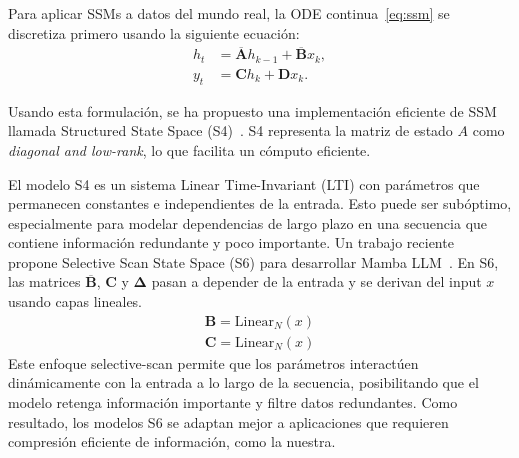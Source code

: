 Para aplicar SSMs a datos del mundo real, la ODE continua~\eqref{eq:ssm} se discretiza primero usando la siguiente ecuación:
\begin{equation}
\begin{aligned}
\label{eq:discrete_ssm}
h_t &= \mathbf{\overline{A}}h_{k-1} + \mathbf{\overline{B}}x_{k}, \\
y_t &= \mathbf{C}h_k + \mathbf{D}x_k.
\end{aligned}
\end{equation}

Usando esta formulación, se ha propuesto una implementación eficiente de SSM llamada Structured State Space (S4)~\cite{gu2022efficiently}. S4 representa la matriz de estado $A$ como \textit{diagonal and low-rank}, lo que facilita un cómputo eficiente.

El modelo S4 es un sistema Linear Time-Invariant (LTI) con parámetros que permanecen constantes e independientes de la entrada. Esto puede ser subóptimo, especialmente para modelar dependencias de largo plazo en una secuencia que contiene información redundante y poco importante. Un trabajo reciente~\cite{gu2023mamba} propone Selective Scan State Space (S6) para desarrollar Mamba LLM~\cite{gu2023mamba}. En S6, las matrices $\mathbf{\overline{B}}$, $ \mathbf{C}$ y $\mathbf{\Delta}$ pasan a depender de la entrada y se derivan del input $x$ usando capas lineales.
\begin{equation}
\begin{aligned}
   \mathbf{B} = \text{Linear}_N(x)\\
   \mathbf{C} = \text{Linear}_N(x)
\end{aligned}
\end{equation}
Este enfoque selective-scan permite que los parámetros interactúen dinámicamente con la entrada a lo largo de la secuencia, posibilitando que el modelo retenga información importante y filtre datos redundantes. Como resultado, los modelos S6 se adaptan mejor a aplicaciones que requieren compresión eficiente de información, como la nuestra.
